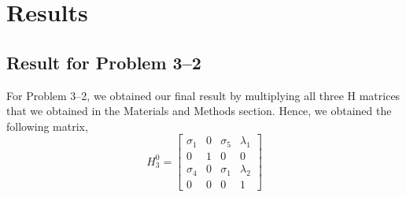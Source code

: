 \documentclass[conference]{IEEEtran}
\begin{document}
\begin{table}[h!]
    \begin{center}
    \end{center}
    \caption{Denavit-Hartenberg table for Problem 3--5}
\end{table}

\section{Results}

\subsection{Result for Problem 3--2}

For Problem 3--2, we obtained our final result by multiplying all three H matrices
that we obtained in the Materials and Methods section. Hence, we obtained the following
matrix,
\[
    H^0_3 =
    \begin{bmatrix}
    \sigma_1  & 0 & \sigma_5  & \lambda_1 \\
    0 & 1 & 0 & 0\\
    \sigma_4 & 0 & \sigma_1  & \lambda_2 \\
    0 & 0 & 0 & 1
    \end{bmatrix}
\]
\end{document}
